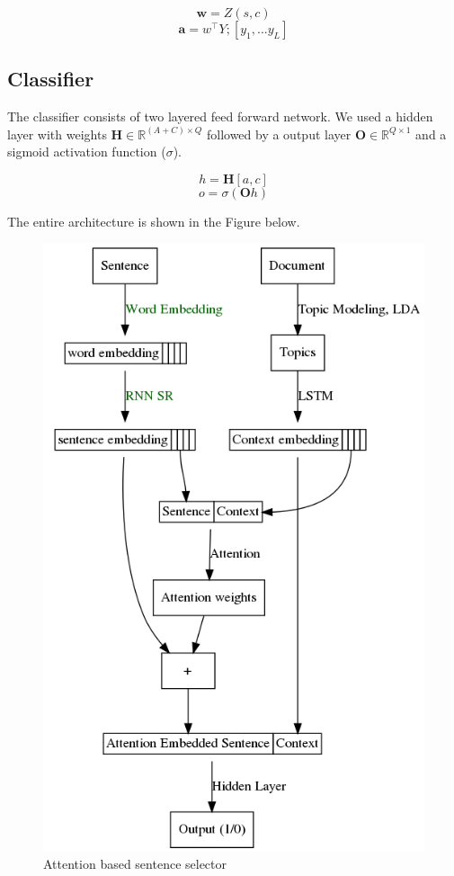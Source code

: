 \begin{equation}
\boldsymbol{w} = Z(s,c)
\label{eq2}
\end{equation}
\begin{equation}
\boldsymbol{a} = w^\intercal Y;   [y_1,...y_L]
\end{equation}


\subsection{Classifier} The classifier consists of two layered feed forward network. We used a hidden layer with weights $\boldsymbol{H} \in \mathbb{R}^{(A+C) \times Q}$ followed by a output layer $\boldsymbol{O} \in \mathbb{R}^{Q \times 1}$ and a sigmoid activation function ($\sigma$). 

\begin{equation}
h = \boldsymbol{H}[a,c]
\end{equation}
\begin{equation}
o = \sigma(\boldsymbol{O}h)
\end{equation}

The entire architecture is shown in the Figure below.
\begin{figure}
\includegraphics[scale=0.4]{graph.png}
\caption{Attention based sentence selector}	
\end{figure}


